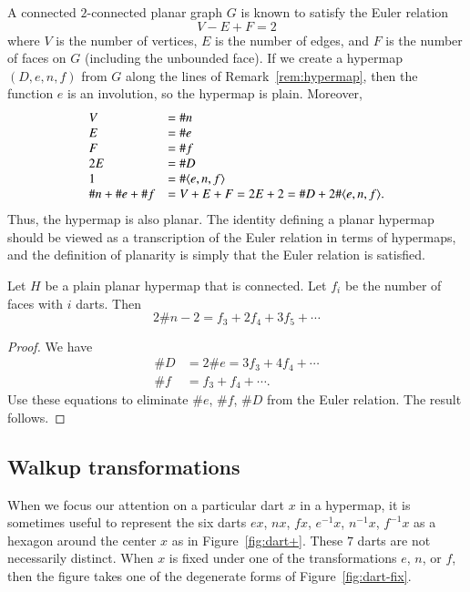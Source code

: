 \begin{remark}  A connected $2$-connected
planar graph $G$ is known to satisfy the Euler relation
    $$ V - E + F = 2$$
where $V$ is the number of vertices, $E$ is the number of edges, and
$F$ is the number of faces on $G$ (including the unbounded face). If
we create a hypermap $(D,e,n,f)$ from $G$ along the lines of
Remark~\ref{rem:hypermap}, then the function $e$ is an involution,
so the hypermap is plain. Moreover,
    $$\begin{array}{lll}
    V &= \# n\\
    E &= \# e\\
    F &= \# f\\
    2E &= \# D\\
    1 &= \#\langle e,n,f\rangle\\
    \# n + \#e + \# f &= V + E + F = 2 E + 2 = \# D + 2 \#\langle e,n,f\rangle.
    \end{array}
    $$
Thus, the hypermap is also planar.  The identity defining a planar
hypermap should be viewed as a transcription of the Euler relation
in terms of hypermaps, and the definition of planarity is simply
that the Euler relation is satisfied.
\end{remark}

\begin{lemma}  Let $H$ be a plain planar hypermap that is connected.
Let $f_i$ be the number of faces with $i$ darts.  Then
    $$2 \# n - 2 =  f_3 + 2 f_4 + 3 f_5 +\cdots$$
\end{lemma}

\begin{proof}  We have
    $$
    \begin{array}{lll}
     \# D &= 2 \# e = 3 f_3 + 4 f_4 + \cdots\\
    \# f &= f_3 + f_4 + \cdots.
    \end{array}
    $$
Use these equations to eliminate $\#e$, $\#f$, $\#D$ from the Euler
relation.  The result follows.
\end{proof}



\subsection{Walkup transformations}

When we focus our attention on a particular dart $x$ in a
hypermap, it is sometimes useful to represent the six darts $e x$,
$n x$, $f x$, $e^{-1} x$, $n^{-1} x$, $f^{-1} x$ as a hexagon
around the center $x$ as in Figure~\ref{fig:dart+}.  These $7$
darts are not necessarily distinct.   When $x$ is fixed under one
of the transformations $e$, $n$, or $f$, then the figure takes one
of the degenerate forms of Figure~\ref{fig:dart-fix}.


